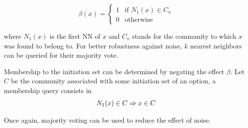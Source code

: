 \begin{equation}
\beta(x) = 
\begin{cases}
1 & \text{if } N_1(x) \in C_x\\
0 & \text{otherwise}
\end{cases}
\end{equation}

where $N_1(x)$ is the first NN of $x$ and $C_x$ stands for the community to which $x$ was found to belong to. For better robustness against noise, $k$ nearest neighbors can be queried for their majority vote.

Membership to the initiation set can be determined by negating the effect $\beta$. Let $C$ be the community associated with some initiation set of an option, a membership query consists in
\begin{equation}
N_1(x) \in C \Rightarrow x \in C  \\
\end{equation}

Once again, majority voting can be used to reduce the effect of noise. 
